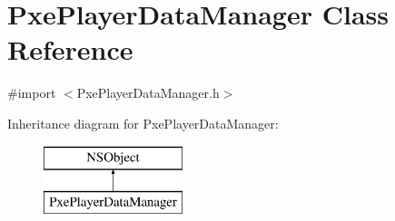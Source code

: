 \hypertarget{interface_pxe_player_data_manager}{\section{Pxe\-Player\-Data\-Manager Class Reference}
\label{interface_pxe_player_data_manager}
}


{\ttfamily \#import $<$Pxe\-Player\-Data\-Manager.\-h$>$}

Inheritance diagram for Pxe\-Player\-Data\-Manager\-:\begin{figure}[H]
\begin{center}
\leavevmode
\includegraphics[height=2.000000cm]{interface_pxe_player_data_manager}
\end{center}
\end{figure}
